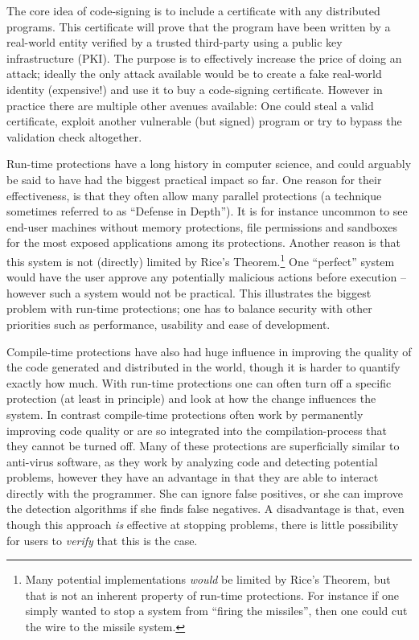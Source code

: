 The core idea of code-signing is to include a certificate with any distributed
programs. This certificate will prove that the program have been written by a
real-world entity verified by a trusted third-party using a public key
infrastructure (PKI). The purpose is to effectively increase the price of doing
an attack; ideally the only attack available would be to create a fake
real-world identity (expensive!) and use it to buy a code-signing
certificate. However in practice there are multiple other avenues available: One
could steal a valid certificate, exploit another vulnerable (but signed) program
or try to bypass the validation check altogether.

Run-time protections have a long history in computer science, and could arguably
be said to have had the biggest practical impact so far. One reason for their
effectiveness, is that they often allow many parallel protections (a technique
sometimes referred to as ``Defense in Depth''). It is for instance uncommon to
see end-user machines without memory protections, file permissions and sandboxes
for the most exposed applications among its protections. Another reason is that
this system is not (directly) limited by Rice's Theorem.\footnote{Many potential
  implementations \emph{would} be limited by Rice's Theorem, but that is not an
  inherent property of run-time protections. For instance if one simply wanted
  to stop a system from ``firing the missiles'', then one could cut the wire to
  the missile system.} One ``perfect'' system would have the user approve any
potentially malicious actions before execution -- however such a system would
not be practical. This illustrates the biggest problem with run-time
protections; one has to balance security with other priorities such as
performance, usability and ease of development.

Compile-time protections have also had huge influence in improving the quality
of the code generated and distributed in the world, though it is harder to
quantify exactly how much. With run-time protections one can often turn off a
specific protection (at least in principle) and look at how the change
influences the system. In contrast compile-time protections often work by
permanently improving code quality or are so integrated into the
compilation-process that they cannot be turned off. Many of these protections
are superficially similar to anti-virus software, as they work by analyzing code
and detecting potential problems, however they have an advantage in that they
are able to interact directly with the programmer. She can ignore false
positives, or she can improve the detection algorithms if she finds false
negatives. A disadvantage is that, even though this approach \emph{is} effective
at stopping problems, there is little possibility for users to \emph{verify}
that this is the case.

